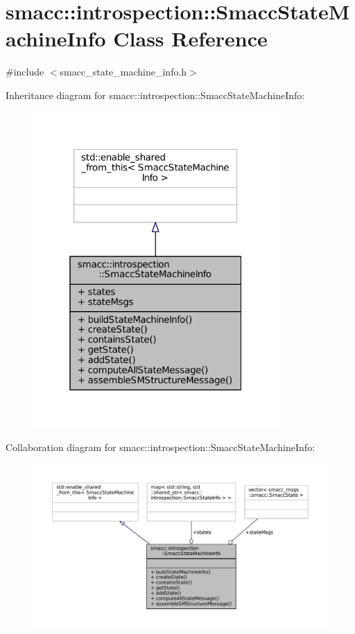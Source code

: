 \hypertarget{classsmacc_1_1introspection_1_1SmaccStateMachineInfo}{}\section{smacc\+:\+:introspection\+:\+:Smacc\+State\+Machine\+Info Class Reference}
\label{classsmacc_1_1introspection_1_1SmaccStateMachineInfo}


{\ttfamily \#include $<$smacc\+\_\+state\+\_\+machine\+\_\+info.\+h$>$}



Inheritance diagram for smacc\+:\+:introspection\+:\+:Smacc\+State\+Machine\+Info\+:
\nopagebreak
\begin{figure}[H]
\begin{center}
\leavevmode
\includegraphics[width=265pt]{classsmacc_1_1introspection_1_1SmaccStateMachineInfo__inherit__graph}
\end{center}
\end{figure}


Collaboration diagram for smacc\+:\+:introspection\+:\+:Smacc\+State\+Machine\+Info\+:
\nopagebreak
\begin{figure}[H]
\begin{center}
\leavevmode
\includegraphics[width=350pt]{classsmacc_1_1introspection_1_1SmaccStateMachineInfo__coll__graph}
\end{center}
\end{figure}
